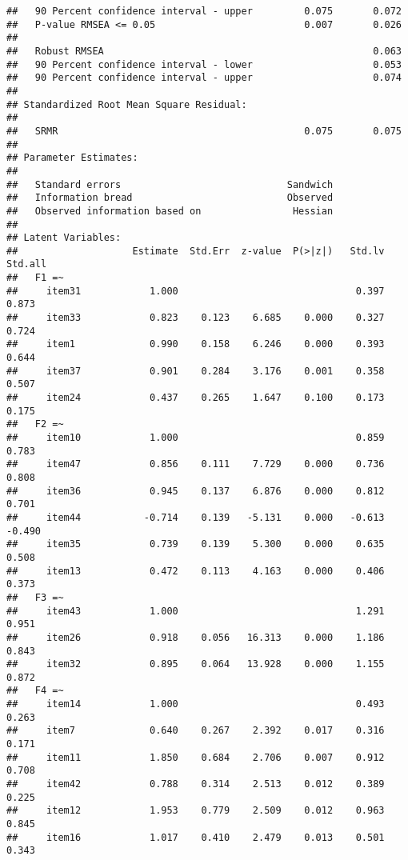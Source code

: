 \documentclass[
  english,
  man]{apa6}
\begin{document}
\begin{verbatim}
##   90 Percent confidence interval - upper         0.075       0.072
##   P-value RMSEA <= 0.05                          0.007       0.026
##                                                                   
##   Robust RMSEA                                               0.063
##   90 Percent confidence interval - lower                     0.053
##   90 Percent confidence interval - upper                     0.074
## 
## Standardized Root Mean Square Residual:
## 
##   SRMR                                           0.075       0.075
## 
## Parameter Estimates:
## 
##   Standard errors                             Sandwich
##   Information bread                           Observed
##   Observed information based on                Hessian
## 
## Latent Variables:
##                    Estimate  Std.Err  z-value  P(>|z|)   Std.lv  Std.all
##   F1 =~                                                                 
##     item31            1.000                               0.397    0.873
##     item33            0.823    0.123    6.685    0.000    0.327    0.724
##     item1             0.990    0.158    6.246    0.000    0.393    0.644
##     item37            0.901    0.284    3.176    0.001    0.358    0.507
##     item24            0.437    0.265    1.647    0.100    0.173    0.175
##   F2 =~                                                                 
##     item10            1.000                               0.859    0.783
##     item47            0.856    0.111    7.729    0.000    0.736    0.808
##     item36            0.945    0.137    6.876    0.000    0.812    0.701
##     item44           -0.714    0.139   -5.131    0.000   -0.613   -0.490
##     item35            0.739    0.139    5.300    0.000    0.635    0.508
##     item13            0.472    0.113    4.163    0.000    0.406    0.373
##   F3 =~                                                                 
##     item43            1.000                               1.291    0.951
##     item26            0.918    0.056   16.313    0.000    1.186    0.843
##     item32            0.895    0.064   13.928    0.000    1.155    0.872
##   F4 =~                                                                 
##     item14            1.000                               0.493    0.263
##     item7             0.640    0.267    2.392    0.017    0.316    0.171
##     item11            1.850    0.684    2.706    0.007    0.912    0.708
##     item42            0.788    0.314    2.513    0.012    0.389    0.225
##     item12            1.953    0.779    2.509    0.012    0.963    0.845
##     item16            1.017    0.410    2.479    0.013    0.501    0.343

\end{verbatim}
\end{document}
